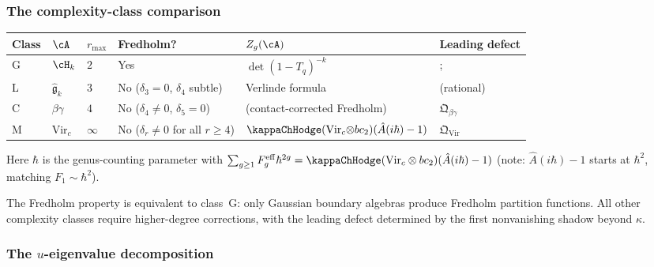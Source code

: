\subsubsection*{The complexity-class comparison}

\begin{center}
\small
\renewcommand{\arraystretch}{1.2}
\begin{tabular}{llllll}
\textbf{Class} & $\cA$ & $r_{\max}$
 & \textbf{Fredholm?} & $Z_g(\cA)$
 & \textbf{Leading defect} \\
\hline
G & $\cH_k$ & $2$
 & Yes & $\det(1-T_q)^{-k}$ &; \\[2pt]
L & $\hat{\mathfrak{g}}_k$ & $3$
 & No ($\delta_3 = 0$, $\delta_4$ subtle)
 & Verlinde formula & (rational) \\[2pt]
C & $\beta\gamma$ & $4$
 & No ($\delta_4 \ne 0$, $\delta_5 = 0$)
 & (contact-corrected Fredholm) & $\mathfrak{Q}_{\beta\gamma}$ \\[2pt]
M & $\mathrm{Vir}_c$ & $\infty$
 & No ($\delta_r \ne 0$ for all $r \ge 4$)
 & $\kappaChHodge(\mathrm{Vir}_c{\otimes}bc_2)(\hat A(i\hbar)-1)$ & $\mathfrak{Q}_{\mathrm{Vir}}$
\end{tabular}
\end{center}

\noindent
Here $\hbar$ is the genus-counting parameter with
$\sum_{g \geq 1} F_g^{\mathrm{eff}}\hbar^{2g}
= \kappaChHodge(\mathrm{Vir}_c\otimes bc_2)(\hat A(i\hbar)-1)$
(note: $\hat A(i\hbar)-1$ starts at $\hbar^2$, matching
$F_1 \sim \hbar^2$).

\noindent
The Fredholm property is equivalent to class~G: only Gaussian
boundary algebras produce Fredholm partition functions. All
other complexity classes require higher-degree corrections, with
the leading defect determined by the first nonvanishing shadow
beyond $\kappa$.

\subsubsection*{The $u$-eigenvalue decomposition}

